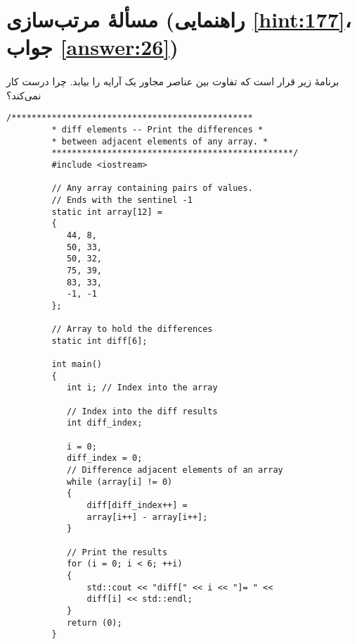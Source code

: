 \section[مسألهٔ مرتب‌سازی]{مسألهٔ مرتب‌سازی \protect{} (راهنمایی \ref{hint:177}، جواب \ref{answer:26})}
\paragraph{}\label{prog:44}
برنامهٔ زیر قرار است که تفاوت بین عناصر مجاور یک آرایه را بیابد. چرا درست کار نمی‌کند؟

\begin{LTR}
    \begin{lstlisting}[style=C++Style]
         /************************************************
         * diff elements -- Print the differences *
         * between adjacent elements of any array. *
         ************************************************/
         #include <iostream>

         // Any array containing pairs of values.
         // Ends with the sentinel -1
         static int array[12] =
         {
         	44, 8,
         	50, 33,
         	50, 32,
         	75, 39,
         	83, 33,
         	-1, -1
         };

         // Array to hold the differences
         static int diff[6];

         int main()
         {
         	int i; // Index into the array

         	// Index into the diff results
         	int diff_index;

         	i = 0;
         	diff_index = 0;
         	// Difference adjacent elements of an array
         	while (array[i] != 0)
         	{
         		diff[diff_index++] =
         		array[i++] - array[i++];
         	}

         	// Print the results
         	for (i = 0; i < 6; ++i)
         	{
         		std::cout << "diff[" << i << "]= " <<
         		diff[i] << std::endl;
         	}
         	return (0);
         }
    \end{lstlisting}
\end{LTR}